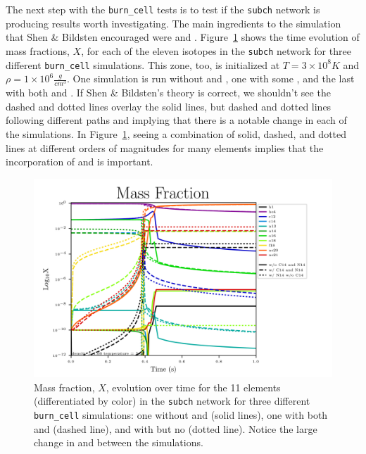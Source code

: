 \documentclass[preprint]{aastex62}
\begin{document}
      The next step with the {\tt burn\_cell} tests is to test if the {\tt subch} network is producing results worth investigating. The main ingredients to the simulation that Shen \& Bildsten encouraged were  and  \citep{shenNbildsten}. Figure~\ref{fig:microphysicsX} shows the time evolution of mass fractions, $X$, for each of the eleven isotopes in the {\tt subch} network for three different {\tt burn\_cell} simulations. This zone, too, is initialized at $T = 3 \times 10^8 K$ and $\rho = 1 \times 10^6 \frac{g}{cm^3}$. One simulation is run without  and , one with some , and the last with both  and . If Shen \& Bildsten's theory is correct, we shouldn't see the dashed and dotted lines overlay the solid lines, but dashed and dotted lines following different paths and implying that there is a notable change in each of the simulations. In Figure~\ref{fig:microphysicsX}, seeing a combination of solid, dashed, and dotted lines at different orders of magnitudes for many elements implies that the incorporation of  and  is important. 
      
      \begin{figure}
        \centering
        \includegraphics[width=6in]{images/subch_nC14nN14_xn_tol-10.png}
        \caption{Mass fraction, $X$, evolution over time for the 11 elements (differentiated by color) in the {\tt subch} network for three different {\tt burn\_cell} simulations: one without  and  (solid lines), one with both  and  (dashed line), and with  but no  (dotted line). Notice the large change in  and  between the simulations.
          }
        \label{fig:microphysicsX}
      \end{figure} 
      
\end{document}
